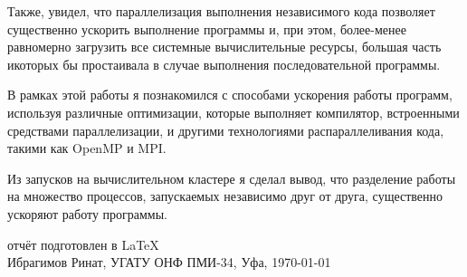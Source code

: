 \documentclass[a4paper,12pt]{article}
\begin{document}
Также, увидел, что параллелизация выполнения независимого кода позволяет существенно ускорить выполнение программы и, при этом, более-менее равномерно загрузить все системные вычислительные ресурсы, большая часть икоторых бы простаивала в случае выполнения последовательной программы.

В рамках этой работы я познакомился с способами ускорения работы программ, используя различные оптимизации, которые выполняет компилятор, встроенными средствами параллелизации, и другими технологиями распараллеливания кода, такими как OpenMP и MPI.

Из запусков на вычислительном кластере я сделал вывод, что разделение работы на множество процессов, запускаемых независимо друг от друга, существенно ускоряют работу программы.
\vfill
\begin{center}
\small отчёт подготовлен в \LaTeX\\
Ибрагимов Ринат, УГАТУ ОНФ ПМИ-34, Уфа, \today
\end{center}
\end{document}
